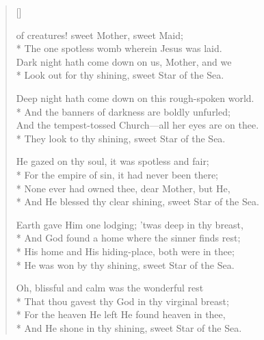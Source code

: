 \newHymn
{}
\settowidth{\versewidth}{Deep night hath come down on this rough-spo}
\begin{verse}[\versewidth]

 of creatures! sweet Mother, sweet Maid;\\*
    The one spotless womb wherein Jesus was laid.\\
    Dark night hath come down on us, Mother, and we\\*
    Look out for thy shining, sweet Star of the Sea.

 Deep night hath come down on this rough-spoken world.~\\*
And the banners of darkness are boldly unfurled;\\
    And the tempest-tossed Church---all her eyes are on thee.~\\*
    They look to thy shining, sweet Star of the Sea.

 He gazed on thy soul, it was spotless and fair;\\*
    For the empire of sin, it had never been there;\\*
    None ever had owned thee, dear Mother, but He,\\*
    And He blessed thy clear shining, sweet Star of the Sea.

    Earth gave Him one lodging; 'twas deep in thy breast,\\*
    And God found a home where the sinner finds rest;\\*
    His home and His hiding-place, both were in thee;\\*
    He was won by thy shining, sweet Star of the Sea.

    Oh, blissful and calm was the wonderful rest\\*
    That thou gavest thy God in thy virginal breast;\\*
    For the heaven He left He found heaven in thee,\\*
    And He shone in thy shining, sweet Star of the Sea.

\end{verse}



